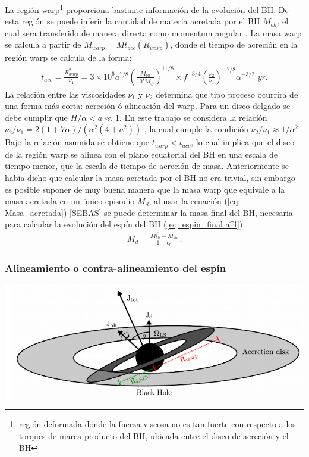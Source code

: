 La región warp\footnote{región deformada donde la fuerza viscosa no es tan fuerte con respecto a los torques de marea producto del BH, ubicada entre el disco de acreción y el BH} proporciona bastante información de la evolución del BH. De esta región se puede inferir la cantidad de materia acretada por el BH $\dot{M_{bh}}$, el cual sera transferido de manera directa como momentum angular \cite{volonteri2007}. La masa warp se calcula a partir de $M_{warp}=\dot{M}t_{acc}(R_{warp})$, donde el tiempo de acreción en la región warp se calcula de la forma:
%
\begin{align}
 t_{acc}=\frac{R^{2}_{warp}}{\nu_{1}} = 3 \times10^{6}a^{7/8} \left(\frac{M_{bh}}{10^{8}M_{\odot}} \right)^{11/8}\times f^{-3/4}\left( \frac{\nu_{2}}{\nu_{1}}\right)^{-7/8}\alpha^{-3/2}\,\, \textit{yr}.
\end{align}
%
La relación entre las viscosidades $\nu_1$ y $\nu_2$ determina que tipo proceso ocurrirá de una forma más corta: acreción ó alineación del warp. Para un disco delgado se debe cumplir que $H/\alpha < a \ll 1$. En este trabajo se considera la relación $\nu_{2}/\nu_{1}=2(1+7\alpha)/(\alpha^{2}(4+a^{2}))$ \cite{ogilvie1999} , la cual cumple la condición $\nu_{2}/\nu_{1}\approx 1/\alpha^{2}$ \cite{papaloizou1983}. Bajo la relación asumida se obtiene que $t_{warp}< t_{acc}$, lo cual implica que el disco de la región warp
se alinea con el plano ecuatorial del BH en una escala de tiempo menor, que la escala de tiempo de acreción de masa. Anteriormente se había dicho que calcular la masa acretada por el BH no era trivial, sin embargo es posible suponer de muy buena manera que la masa warp que equivale a la masa acretada en un único episodio $M_{d}$, al usar la ecuación (\ref{eq: Masa_acretada}) [{\underline{SEBAS}}] se puede determinar la masa final del BH, necesaria para calcular la evolución del espín del BH (\ref{eq: espin_final a^f})
%
\begin{align}
 M_{d}= \frac{M_{bh}^{f}-M_{bh}}{1-\epsilon_{r}}\,.
 \label{eq: Masa_acretada}
\end{align}
%
    \subsubsection{Alineamiento o contra-alineamiento del espín}
    \label{subsubsec: Aling_Spin}
\begin{center}
\includegraphics[scale=.4]{./figures/4_Modelo_Spin/Sistema_con_region_warp.png}
\label{fig: sistema con zona warp}
\end{center}

